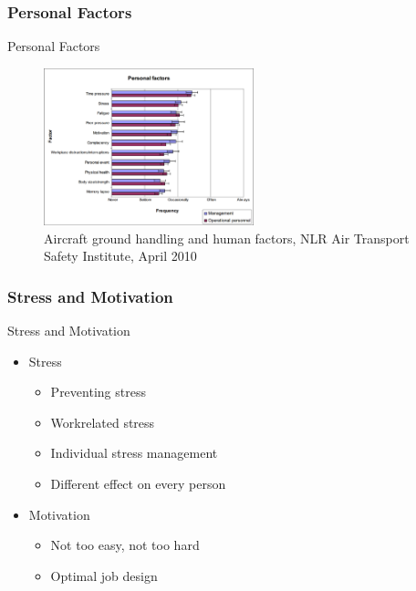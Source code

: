 \subsubsection{Personal Factors}
\begin{frame}{Personal Factors}
	\begin{figure}[H]
		\centering
		\includegraphics[width=230px]{Grafik/PersonalFactors}
		\caption{\footnotesize Aircraft ground handling and human factors, NLR Air Transport Safety Institute, April 2010}
	\end{figure}
\end{frame}

\subsubsection{Stress and Motivation}
\begin{frame}{Stress and Motivation}
	\begin{itemize}
		\item Stress
		\begin{itemize}
			\item{Preventing stress}
			\item Workrelated stress
			\item Individual stress management
			\item Different effect on every person
		\end{itemize}
		\item Motivation
			\begin{itemize}
				\item Not too easy, not too hard
				\item Optimal job design
			\end{itemize}
	\end{itemize}
\end{frame}

